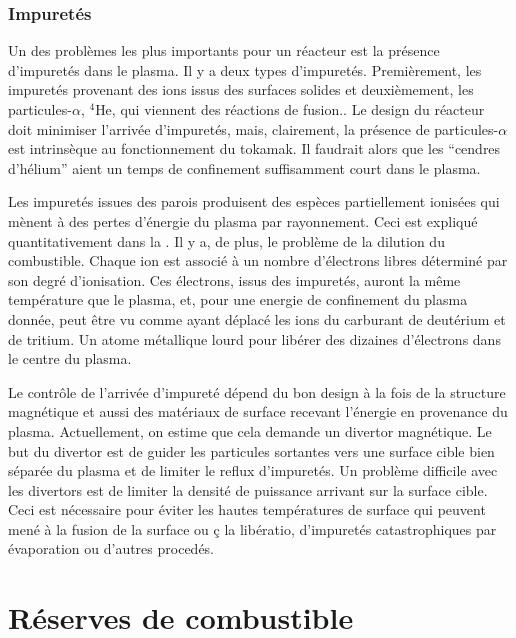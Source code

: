 \documentclass[main.tex]{subfiles}
\begin{document}
\subsubsection*{Impuretés}

Un des problèmes les plus importants pour un réacteur est la présence d'impuretés dans le plasma.
Il y a deux types d'impuretés.
Premièrement, les impuretés provenant des ions issus des surfaces solides et deuxièmement, les particules-\( \alpha \), \( ^4\text{He} \), qui viennent des réactions de fusion..
Le design du réacteur doit minimiser l'arrivée d'impuretés, mais, clairement, la présence de particules-\( \alpha \) est intrinsèque au fonctionnement du tokamak.
Il faudrait alors que les ``cendres d'hélium'' aient un temps de confinement suffisamment court dans le plasma.

Les impuretés issues des parois produisent des espèces partiellement ionisées qui mènent à des pertes d'énergie du plasma par rayonnement.
Ceci est expliqué quantitativement dans la \color{red}{section 4.25 (lien à rajouter quand elle sera faite)}\color{black}.
Il y a, de plus, le problème de la dilution du combustible.
Chaque ion est associé à un nombre d'électrons libres déterminé par son degré d'ionisation.
Ces électrons, issus des impuretés, auront la même température que le plasma, et, pour une energie de confinement du plasma donnée, peut être vu comme ayant déplacé les ions du carburant de deutérium et de tritium.
Un atome métallique lourd pour libérer des dizaines d'électrons dans le centre du plasma.

Le contrôle de l'arrivée d'impureté dépend du bon design à la fois de la structure magnétique et aussi des matériaux de surface recevant l'énergie en provenance du plasma.
Actuellement, on estime que cela demande un divertor magnétique.
Le but du divertor est de guider les particules sortantes vers une surface cible bien séparée du plasma et de limiter le reflux d'impuretés.
Un problème difficile avec les divertors est de limiter la densité de puissance arrivant sur la surface cible.
Ceci est nécessaire pour éviter les hautes températures de surface qui peuvent mené à la fusion de la surface ou ç la libératio,  d'impuretés catastrophiques par évaporation ou d'autres procedés.

\section{Réserves de combustible}
\label{sec:reserves_de_combustible}
\end{document}

